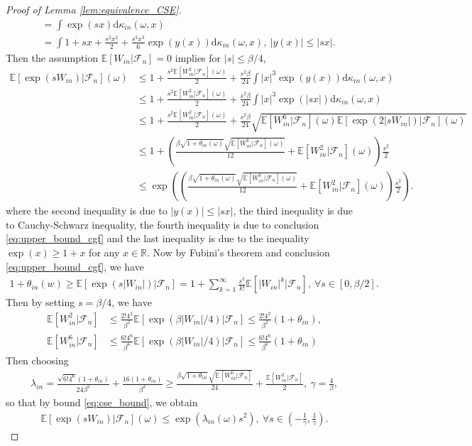 \documentclass[12pt]{article}
\theoremstyle{definition}
\newcommand{\E}{\mathbb E}								%
\begin{document}
\begin{proof}[Proof of Lemma \ref{lem:equivalence_CSE}]
\begin{align*}
		&
		=\int \exp(sx)\mathrm{d}\kappa_{in}(\omega,x)\\
		&
		=\int 1+sx+\frac{s^2x^2}{2}+\frac{s^3x^3}{6}\exp(y(x))\mathrm{d}\kappa_{in}(\omega,x),\ |y(x)|\leq  |sx|.
	\end{align*}
	Then the assumption $\E[W_{in}|\mathcal{F}_n]=0$ implies for $|s|\leq \beta/4$,
	\begin{align}
		\E[\exp(sW_{in})|\mathcal{F}_n](\omega)
		&\nonumber
		\leq 1+\frac{s^2\E[W_{in}^2|\mathcal{F}_n](\omega)}{2}+\frac{s^2\beta}{24}\int |x|^3\exp(y(x))\mathrm{d}\kappa_{in}(\omega,x)\\
		&\nonumber
		\leq 1+\frac{s^2\E[W_{in}^2|\mathcal{F}_n](\omega)}{2}+\frac{s^2\beta}{24}\int |x|^3\exp(|sx|)\mathrm{d}\kappa_{in}(\omega,x)\\
		&\nonumber
		\leq 1+\frac{s^2\E[W_{in}^2|\mathcal{F}_n](\omega)}{2}+\frac{s^2\beta}{24}\sqrt{\E[W_{in}^6|\mathcal{F}_n](\omega)\E[\exp(2|sW_{in}|)|\mathcal{F}_n](\omega)}\\
		&\nonumber
		\leq 1+\left(\frac{\beta \sqrt{1+\theta_{in}(\omega)}\sqrt{\E[W_{in}^6|\mathcal{F}_n](\omega)}}{12}+\E[W_{in}^2|\mathcal{F}_n](\omega)\right)\frac{s^2}{2}\\
		&\label{eq:cse_bound}
		\leq \exp\left(\left(\frac{\beta \sqrt{1+\theta_{in}(\omega)}\sqrt{\E[W_{in}^6|\mathcal{F}_n](\omega)}}{12}+\E[W_{in}^2|\mathcal{F}_n](\omega)\right)\frac{s^2}{2}\right).
	\end{align}
	where the second inequality is due to $|y(x)|\leq|sx|$, the third inequality is due to Cauchy-Schwarz inequality, the fourth inequality is due to conclusion \eqref{eq:upper_bound_cgf} and the last inequality is due to the inequality $\exp(x)\geq 1+x$ for any $x\in\mathbb{R}$. Now by Fubini's theorem and conclusion \eqref{eq:upper_bound_cgf}, we have 
	\begin{align*}
		1+\theta_{in}(w)\geq \E[\exp(s|W_{in}|)|\mathcal{F}_n]=1+\sum_{k=1}^{\infty}\frac{s^k}{k!}\E[|W_{in}|^k|\mathcal{F}_n],\ \forall s\in [0,\beta/2].
	\end{align*}
	Then by setting $s=\beta/4$, we have
	\begin{align*}
		\E[W_{in}^2|\mathcal{F}_n]
		&
		\leq \frac{2!4^2}{\beta^2}\E[\exp(\beta|W_{in}|/4)|\mathcal{F}_n]\leq \frac{2!4^2}{\beta^2}(1+\theta_{in}),\\
		\E[W_{in}^6|\mathcal{F}_n]
		&
		\leq \frac{6!4^6}{\beta^6}\E[\exp(\beta|W_{in}|/4)|\mathcal{F}_n]\leq \frac{6!4^6}{\beta^6}(1+\theta_{in})
	\end{align*}
	Then choosing 
	\begin{align*}
		\lambda_{in}= \frac{\sqrt{6!4^6}(1+\theta_{in})}{24\beta^2}+\frac{16(1+\theta_{in})}{\beta^2}\geq \frac{\beta\sqrt{1+\theta_{in}}\sqrt{\E[W_{in}^6|\mathcal{F}_n]}}{24} +\frac{\E[W_{in}^2|\mathcal{F}_n]}{2},\ \gamma=\frac{4}{\beta},
	\end{align*}
	so that by bound \eqref{eq:cse_bound}, we obtain
	\begin{align*}
		\E[\exp(sW_{in})|\mathcal{F}_n](\omega)\leq \exp(\lambda_{in}(\omega)s^2),\ \forall s\in \left(-\frac{1}{\gamma},\frac{1}{\gamma}\right).
	\end{align*}
\end{proof}
\end{document}
